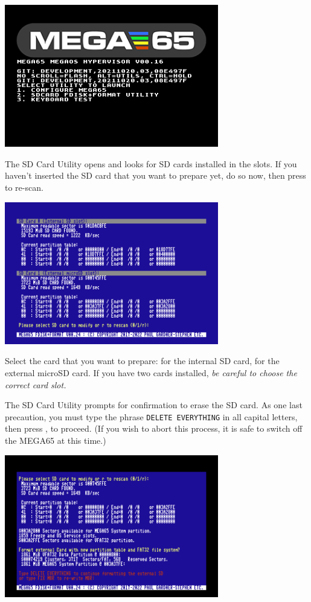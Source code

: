 \begin{center}
\includegraphics[width=0.7\textwidth]{images/ss-utilmenu.png}
\end{center}

The SD Card Utility opens and looks for SD cards installed in the slots. If you haven't inserted the SD card that you want to prepare yet, do so now, then press  to re-scan.

\begin{center}
  \includegraphics[width=0.7\textwidth]{images/ss-m65fdisk-busselect.png}
\end{center}

Select the card that you want to prepare:  for the internal SD card,  for the external microSD card. If you have two cards installed, {\em be careful to choose the correct card slot.}

The SD Card Utility prompts for confirmation to erase the SD card. As one last precaution, you must type the phrase {\tt DELETE EVERYTHING} in all capital letters, then press , to proceed. (If you wish to abort this process, it is safe to switch off the MEGA65 at this time.)

\begin{center}
  \includegraphics[width=0.7\textwidth]{images/ss-m65fdisk-typesomething.png}
\end{center}

